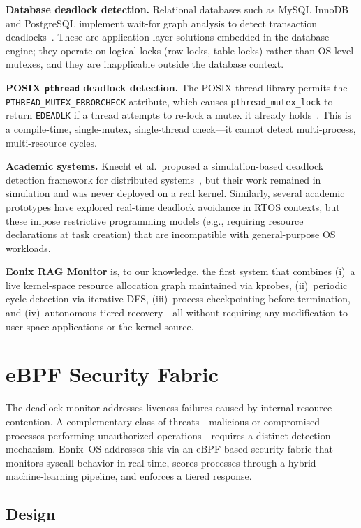 \documentclass[11pt,letterpaper]{article}
\begin{document}
\textbf{Database deadlock detection.}  Relational databases such as
MySQL InnoDB and PostgreSQL implement wait-for graph analysis to detect
transaction deadlocks~\cite{mysql-deadlock}.  These are
application-layer solutions embedded in the database engine; they
operate on logical locks (row locks, table locks) rather than OS-level
mutexes, and they are inapplicable outside the database context.

\textbf{POSIX \texttt{pthread} deadlock detection.}  The POSIX thread
library permits the \texttt{PTHREAD\_MUTEX\_ERRORCHECK} attribute, which
causes \texttt{pthread\_mutex\_lock} to return \texttt{EDEADLK} if a
thread attempts to re-lock a mutex it already holds~\cite{posix}.  This
is a compile-time, single-mutex, single-thread check---it cannot detect
multi-process, multi-resource cycles.

\textbf{Academic systems.}  Knecht et al.\ proposed a simulation-based
deadlock detection framework for distributed systems~\cite{knecht2017},
but their work remained in simulation and was never deployed on a real
kernel.  Similarly, several academic prototypes have explored real-time
deadlock avoidance in RTOS contexts, but these impose restrictive
programming models (e.g., requiring resource declarations at task
creation) that are incompatible with general-purpose OS workloads.

\textbf{Eonix RAG Monitor} is, to our knowledge, the first system that
combines (i)~a live kernel-space resource allocation graph maintained
via kprobes, (ii)~periodic cycle detection via iterative DFS, (iii)~process
checkpointing before termination, and (iv)~autonomous tiered
recovery---all without requiring any modification to user-space
applications or the kernel source.

\section{eBPF Security Fabric}

The deadlock monitor addresses liveness failures caused by internal
resource contention.  A complementary class of threats---malicious or
compromised processes performing unauthorized operations---requires a
distinct detection mechanism.  Eonix~OS addresses this via an
eBPF-based security fabric that monitors syscall behavior in real time,
scores processes through a hybrid machine-learning pipeline, and
enforces a tiered response.

\subsection{Design}
\end{document}
